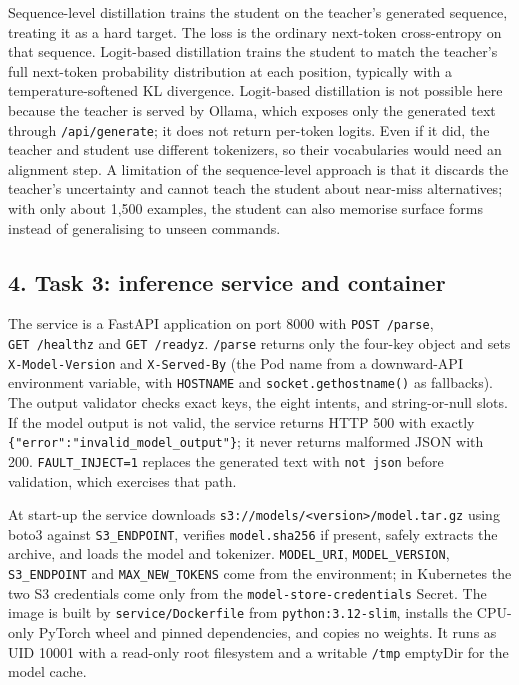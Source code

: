 \documentclass[
]{article}
\begin{document}
Sequence-level distillation trains the student on the teacher's
generated sequence, treating it as a hard target. The loss is the
ordinary next-token cross-entropy on that sequence. Logit-based
distillation trains the student to match the teacher's full next-token
probability distribution at each position, typically with a
temperature-softened KL divergence. Logit-based distillation is not
possible here because the teacher is served by Ollama, which exposes
only the generated text through \texttt{/api/generate}; it does not
return per-token logits. Even if it did, the teacher and student use
different tokenizers, so their vocabularies would need an alignment
step. A limitation of the sequence-level approach is that it discards
the teacher's uncertainty and cannot teach the student about near-miss
alternatives; with only about 1,500 examples, the student can also
memorise surface forms instead of generalising to unseen commands.

\hypertarget{task-3-inference-service-and-container}{%
\subsection{4. Task 3: inference service and
container}\label{task-3-inference-service-and-container}}

The service is a FastAPI application on port 8000 with
\texttt{POST\ /parse}, \texttt{GET\ /healthz} and \texttt{GET\ /readyz}.
\texttt{/parse} returns only the four-key object and sets
\texttt{X-Model-Version} and \texttt{X-Served-By} (the Pod name from a
downward-API environment variable, with \texttt{HOSTNAME} and
\texttt{socket.gethostname()} as fallbacks). The output validator checks
exact keys, the eight intents, and string-or-null slots. If the model
output is not valid, the service returns HTTP 500 with exactly
\texttt{\{"error":"invalid\_model\_output"\}}; it never returns
malformed JSON with 200. \texttt{FAULT\_INJECT=1} replaces the generated
text with \texttt{not\ json} before validation, which exercises that
path.

At start-up the service downloads
\texttt{s3://models/\textless{}version\textgreater{}/model.tar.gz} using
boto3 against \texttt{S3\_ENDPOINT}, verifies \texttt{model.sha256} if
present, safely extracts the archive, and loads the model and tokenizer.
\texttt{MODEL\_URI}, \texttt{MODEL\_VERSION}, \texttt{S3\_ENDPOINT} and
\texttt{MAX\_NEW\_TOKENS} come from the environment; in Kubernetes the
two S3 credentials come only from the \texttt{model-store-credentials}
Secret. The image is built by \texttt{service/Dockerfile} from
\texttt{python:3.12-slim}, installs the CPU-only PyTorch wheel and
pinned dependencies, and copies no weights. It runs as UID 10001 with a
read-only root filesystem and a writable \texttt{/tmp} emptyDir for the
model cache.
\end{document}
